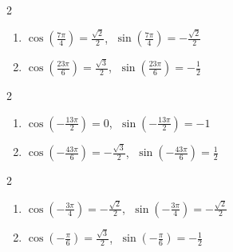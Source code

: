 \documentclass{ximera}
\begin{document}
\begin{multicols}{2}

\begin{enumerate}

\setcounter{enumi}{\value{HW}}

\item $\cos \left(\frac{7\pi}{4} \right) = \frac{\sqrt{2}}{2}$, $\; \sin \left(\frac{7\pi}{4} \right) = -\frac{\sqrt{2}}{2}$

\item $\cos\left(\frac{23\pi}{6}\right) = \frac{\sqrt{3}}{2}$, $\; \sin\left(\frac{23\pi}{6}\right) = -\frac{1}{2}$

\setcounter{HW}{\value{enumi}}

\end{enumerate}

\end{multicols}

\begin{multicols}{2}

\begin{enumerate}

\setcounter{enumi}{\value{HW}}

\item $\cos \left(-\frac{13\pi}{2}\right) = 0$, $\; \sin \left(-\frac{13\pi}{2}\right) = -1$ 

\item $\cos\left(-\frac{43\pi}{6}\right) = -\frac{\sqrt{3}}{2}$, $\; \sin\left(-\frac{43\pi}{6}\right) = \frac{1}{2}$

\setcounter{HW}{\value{enumi}}

\end{enumerate}

\end{multicols}

\begin{multicols}{2}

\begin{enumerate}

\setcounter{enumi}{\value{HW}}

\item $\cos \left(-\frac{3\pi}{4} \right) = -\frac{\sqrt{2}}{2}$, $\; \sin \left(-\frac{3\pi}{4} \right) = -\frac{\sqrt{2}}{2}$

\item $\cos\left(-\frac{\pi}{6}\right) = \frac{\sqrt{3}}{2}$, $\; \sin\left(-\frac{\pi}{6}\right) = -\frac{1}{2}$

\setcounter{HW}{\value{enumi}}

\end{enumerate}

\end{multicols}
\end{document}
